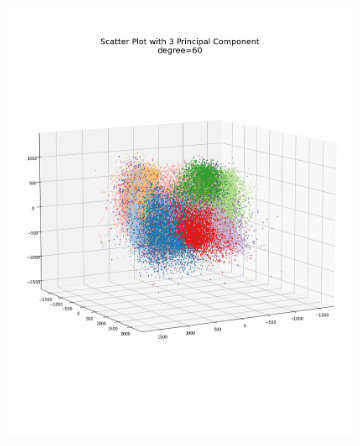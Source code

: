 \documentclass[12pt, a4paper]{article}
\begin{document}
\begin{figure}[h]
\begin{subfigure}{0.3\linewidth}
        \includegraphics[width=\linewidth]{images/q4/a/projection_to_3d_with_angle60.png}
    \end{subfigure}
    \hfill
    \begin{subfigure}{0.3\linewidth}
        \centering

\end{subfigure}
\end{figure}
\end{document}
